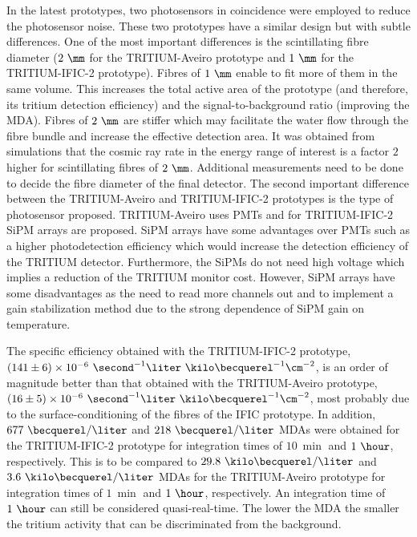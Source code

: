 \begin{enumerate}
In the latest prototypes, two photosensors in coincidence were employed to reduce the photosensor noise. These two prototypes have a similar design but with subtle differences. One of the most important differences is the scintillating fibre diameter ($2~\mm$ for the TRITIUM-Aveiro prototype and $1~\mm$ for the TRITIUM-IFIC-2 prototype). Fibres of $1~\mm$ enable to fit more of them in the same volume. This increases the total active area of the prototype (and therefore, its tritium detection efficiency) and the signal-to-background ratio (improving the MDA). Fibres of $2~\mm$ are stiffer which may facilitate the water flow through the fibre bundle and increase the effective detection area. It was obtained from simulations that the cosmic ray rate in the energy range of interest is a factor $2$ higher for scintillating fibres of $2~\mm$. Additional measurements need to be done to decide the fibre diameter of the final detector. The second important difference between the TRITIUM-Aveiro and TRITIUM-IFIC-2 prototypes is the type of photosensor proposed. TRITIUM-Aveiro uses PMTs and for TRITIUM-IFIC-2 SiPM arrays are proposed. SiPM arrays have some advantages over PMTs such as a higher photodetection efficiency which would increase the detection efficiency of the TRITIUM detector. Furthermore, the SiPMs do not need high voltage which implies a reduction of the TRITIUM monitor cost. However, SiPM arrays have some disadvantages as the need to read more channels out and to implement a gain stabilization method due to the strong dependence of SiPM gain on temperature.

The specific efficiency obtained with the TRITIUM-IFIC-2 prototype, $(141 \pm 6) \times 10^{-6}~ \second^{-1}  \liter ~ \kilo\becquerel^{-1} \cm^{-2}$, is an order of magnitude better than that obtained with the TRITIUM-Aveiro prototype, $(16 \pm 5)\times 10^{-6}~ \second^{-1}  \liter ~ \kilo\becquerel^{-1} \cm^{-2}$, most probably due to the surface-conditioning of the fibres of the IFIC prototype. In addition, $677~\becquerel/\liter$ and $218~\becquerel/\liter$ MDAs were obtained for the TRITIUM-IFIC-2 prototype for integration times of $10~\min$ and $1~\hour$, respectively. This is to be compared to $29.8~\kilo\becquerel/\liter$ and $3.6~\kilo\becquerel/\liter$ MDAs for the TRITIUM-Aveiro prototype for integration times of $1~\min$ and $1~\hour$, respectively. An integration time of $1~\hour$ can still be considered quasi-real-time. The lower the MDA the smaller the tritium activity that can be discriminated from the background.


\end{enumerate}
